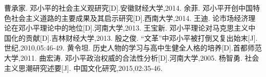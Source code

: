 \documentclass[cs4size,a4paper,nofonts]{ctexart}
\begin{document}
\newpage

\begin{thebibliography}{10}
 曹承家. 邓小平的社会主义观研究[D].安徽财经大学,2014.
 余菲. 邓小平开创中国特色社会主义道路的主要成果及其启示研究[D].西南大学,2014.
 王迪. 论市场经济理论在邓小平理论中的地位[D].河南大学,2013.
 王宝新. 邓小平理论对马克思主义中国化的贡献[D].吉林财经大学,2013.
 殷之俊. “文革”中邓小平被打倒又复出始末[J]. 世纪,2010,05:46-49.
 黄令坦. 历史人物的学习与高中生健全人格的培养[D].首都师范大学,2011.
 曲宏涛. 邓小平政治权威的合法性分析[D].河南大学,2005.
 杨智勇. 社会主义思潮研究述要[J]. 中国文化研究,2015,02:35-46.
\end{thebibliography}


\end{document}
